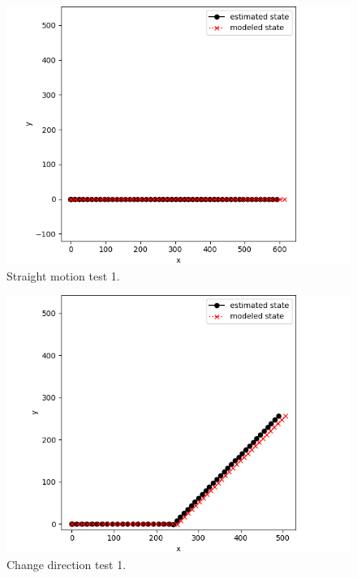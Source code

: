 \begin{figure}[!htb]
	\begin{center}
		\includegraphics[scale=0.480]{imgs/ekf_straight_motion_1.png}
	\end{center}
	\caption{ Straight motion test 1.}
	\label{ekf_straight_motion_1}
\end{figure}

\begin{figure}[!htb]
	\begin{center}
		\includegraphics[scale=0.480]{imgs/ekf_change_direction_1.png}
	\end{center}
	\caption{ Change direction test 1.}
	\label{ekf_change_direction_1}
\end{figure}

